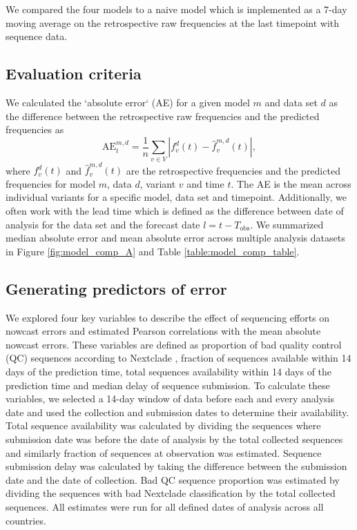 \documentclass[11pt,oneside,letterpaper]{article}
\begin{document}
We compared the four models to a naive model which is implemented as a 7-day moving average on the retrospective raw frequencies at the last timepoint with sequence data.

\subsection*{Evaluation criteria}

We calculated the `absolute error` (AE) for a given model $m$ and data set $d$ as the difference between the retrospective raw frequencies and the predicted frequencies as
\begin{equation}
    \mathrm{AE}_{t}^{m,d} = \frac{1}{n} \sum_{v \in V} \left|f_{v}^{d}(t) - \hat{f}^{m,d}_{v}(t) \right|,
\end{equation}
where $f_{v}^{d}(t)$ and $\hat{f}_{v}^{m,d}(t)$ are the retrospective frequencies and the predicted frequencies for model $m$, data $d$, variant $v$ and time $t$.
The AE is the mean across individual variants for a specific model, data set and timepoint.
Additionally, we often work with the lead time which is defined as the difference between date of analysis for the data set and the forecast date $l = t - T_{\text{obs}}$.
We summarized median absolute error and mean absolute error across multiple analysis datasets in Figure \ref{fig:model_comp_A} and Table \ref{table:model_comp_table}.

\subsection*{Generating predictors of error}

We explored four key variables to describe the effect of sequencing efforts on nowcast errors and estimated Pearson correlations with the mean absolute nowcast errors.
These variables are defined as proportion of bad quality control (QC) sequences according to Nextclade \cite{aksamentov2021nextclade}, fraction of sequences available within 14 days of the prediction time, total sequences availability within 14 days of the prediction time and median delay of sequence submission.
To calculate these variables, we selected a 14-day window of data before each and every analysis date and used the collection and submission dates to determine their availability.
Total sequence availability was calculated by dividing the sequences where submission date was before the date of analysis by the total collected sequences and similarly fraction of sequences at observation was estimated.
Sequence submission delay was calculated by taking the difference between the submission date and the date of collection.
Bad QC sequence proportion was estimated by dividing the sequences with bad Nextclade classification by the total collected sequences.
All estimates were run for all defined dates of analysis across all countries.
\end{document}

